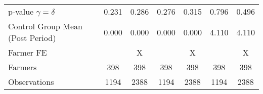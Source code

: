 {\begin{longtable}{l*{6}{c}}
p-value $\gamma=\delta$&    0.231         &    0.286         &    0.276         &    0.315         &    0.796         &    0.496         \\
Control Group Mean (Post Period)&    0.000         &    0.000         &    0.000         &    0.000         &    4.110         &    4.110         \\
Farmer FE       &                  &        X         &                  &        X         &                  &        X         \\
Farmers         &      398         &      398         &      398         &      398         &      398         &      398         \\
Observations    &     1194         &     2388         &     1194         &     2388         &     1194         &     2388         \\
\hline\hline
\end{longtable}
}
